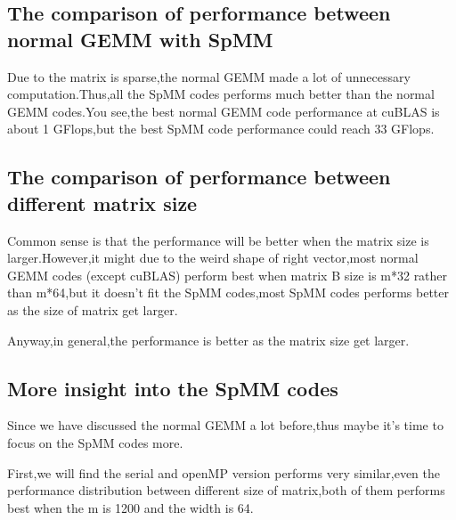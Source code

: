 \documentclass[11pt]{scrartcl} %
\begin{document}
\subsection{The comparison of performance between normal GEMM with SpMM}
Due to the matrix is sparse,the normal GEMM made a lot of unnecessary computation.Thus,all the SpMM codes performs much better than the normal GEMM codes.You see,the best normal GEMM code performance at cuBLAS is about 1 GFlops,but the best SpMM code performance could reach 33 GFlops.
\subsection{The comparison of performance between different matrix size}
Common sense is that the performance will be better when the matrix size is larger.However,it might due to the weird shape of right vector,most normal GEMM codes (except cuBLAS) perform best when matrix B size is m*32 rather than m*64,but it doesn't fit the SpMM codes,most SpMM codes performs better as the size of matrix get larger.

Anyway,in general,the performance is better as the matrix size get larger.
\subsection{More insight into the SpMM codes}
Since we have discussed the normal GEMM a lot before,thus maybe it's time to focus on the SpMM codes more.

First,we will find the serial and openMP version performs very similar,even the performance distribution between different size of matrix,both of them performs best when the m is 1200 and the width is 64.
\end{document}
